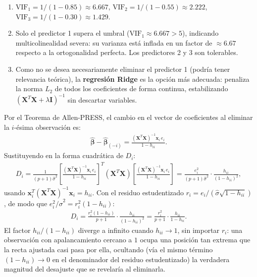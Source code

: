 \begin{solproblema}[prob:46ca545]
	\begin{enumerate}
		\item $\text{VIF}_1 = 1/(1-0.85) \approx 6.667$, $\text{VIF}_2 = 1/(1-0.55) \approx 2.222$, $\text{VIF}_3 = 1/(1-0.30) \approx 1.429$.
		\item Solo el predictor 1 supera el umbral ($\text{VIF}_1\approx6.667>5$), indicando multicolinealidad severa: su varianza está inflada en un factor de $\approx6.67$ respecto a la ortogonalidad perfecta. Los predictores 2 y 3 son tolerables.
		\item Como no se desea necesariamente eliminar el predictor 1 (podría tener relevancia teórica), la \textbf{regresión Ridge} es la opción más adecuada: penaliza la norma $L_2$ de todos los coeficientes de forma continua, estabilizando $(\mathbf{X}^T\mathbf{X}+\lambda\mathbf{I})^{-1}$ sin descartar variables.
	\end{enumerate}
\end{solproblema}

\begin{solproblema}
	Por el Teorema de Allen-PRESS, el cambio en el vector de coeficientes al eliminar la $i$-ésima observación es:
	\begin{align}
		\hat{\boldsymbol\beta}-\hat{\boldsymbol\beta}_{(-i)} = \frac{(\mathbf{X}^T\mathbf{X})^{-1}\mathbf{x}_i \, e_i}{1-h_{ii}}.
	\end{align}
	Sustituyendo en la forma cuadrática de $D_i$:
	\begin{align}
		D_i = \frac{1}{(p+1)\hat\sigma^2}\left[\frac{(\mathbf{X}^T\mathbf{X})^{-1}\mathbf{x}_i \, e_i}{1-h_{ii}}\right]^T (\mathbf{X}^T\mathbf{X}) \left[\frac{(\mathbf{X}^T\mathbf{X})^{-1}\mathbf{x}_i \, e_i}{1-h_{ii}}\right] = \frac{e_i^2}{(p+1)\hat\sigma^2}\cdot\frac{h_{ii}}{(1-h_{ii})^2},
	\end{align}
	usando $\mathbf{x}_i^T(\mathbf{X}^T\mathbf{X})^{-1}\mathbf{x}_i = h_{ii}$. Con el residuo estudentizado $r_i = e_i/(\hat\sigma\sqrt{1-h_{ii}})$, de modo que $e_i^2/\hat\sigma^2 = r_i^2(1-h_{ii})$:
	\begin{align}
		D_i = \frac{r_i^2(1-h_{ii})}{p+1}\cdot\frac{h_{ii}}{(1-h_{ii})^2} = \frac{r_i^2}{p+1}\cdot\frac{h_{ii}}{1-h_{ii}}.
	\end{align}
	El factor $h_{ii}/(1-h_{ii})$ diverge a infinito cuando $h_{ii}\to1$, sin importar $r_i$: una observación con apalancamiento cercano a $1$ ocupa una posición tan extrema que la recta ajustada casi pasa por ella, ocultando (vía el mismo término $(1-h_{ii})\to0$ en el denominador del residuo estudentizado) la verdadera magnitud del desajuste que se revelaría al eliminarla.
\end{solproblema}

